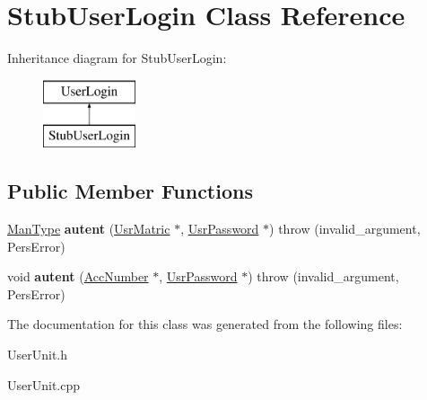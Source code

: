 \hypertarget{classStubUserLogin}{\section{Stub\-User\-Login Class Reference}
\label{d1/dbd/classStubUserLogin}
}
Inheritance diagram for Stub\-User\-Login\-:\begin{figure}[H]
\begin{center}
\leavevmode
\includegraphics[height=2.000000cm]{d1/dbd/classStubUserLogin}
\end{center}
\end{figure}
\subsection*{Public Member Functions}
\begin{DoxyCompactItemize}
\item 
\hypertarget{classStubUserLogin_a9d84171d20e4e5dd9efb24cec9e61928}{\hyperlink{classUsrType}{Man\-Type} {\bfseries autent} (\hyperlink{classUsrMatric}{Usr\-Matric} $\ast$, \hyperlink{classUsrPassword}{Usr\-Password} $\ast$)  throw (invalid\-\_\-argument, Pers\-Error)}\label{d1/dbd/classStubUserLogin_a9d84171d20e4e5dd9efb24cec9e61928}

\item 
\hypertarget{classStubUserLogin_a27bea5e442f63d62863ea4db5553d5cd}{void {\bfseries autent} (\hyperlink{classAccNumber}{Acc\-Number} $\ast$, \hyperlink{classUsrPassword}{Usr\-Password} $\ast$)  throw (invalid\-\_\-argument, Pers\-Error)}\label{d1/dbd/classStubUserLogin_a27bea5e442f63d62863ea4db5553d5cd}

\end{DoxyCompactItemize}


The documentation for this class was generated from the following files\-:\begin{DoxyCompactItemize}
\item 
User\-Unit.\-h\item 
User\-Unit.\-cpp\end{DoxyCompactItemize}
